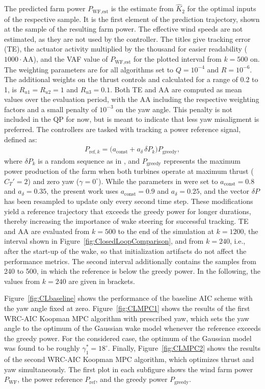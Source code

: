 The predicted farm power $P_{\text{WF,est}}$ is the estimate from $\hat{K}_2$ for the optimal inputs of the respective sample. It is the first element of the prediction trajectory, shown at the sample of the resulting farm power. The effective wind speeds are not estimated, as they are not used by the controller. The titles give tracking error (TE), the actuator activity multiplied by the thousand for easier readability ($1000\cdot$AA), and the VAF value of $P_{\text{WF,est}}$ for the plotted interval from $k = 500$ on. The weighting parameters are for all algorithms set to $Q = 10^{-4}$ and $R = 10^{-6}$. The additional weights on the thrust controls and calculated for a range of 0.2 to 1, is $R_{u1}=R_{u2}=1$ and $R_{u3}=0.1$. Both TE and AA are computed as mean values over the evaluation period, with the AA including the respective weighting factors and a small penalty of $10^{-3}$ on the yaw angle. This penalty is not included in the QP for now, but is meant to indicate that less yaw misaligment is preferred.
%
The controllers are tasked with tracking a power reference signal, defined as:
\begin{align*}
P_{\text{ref},k} = \big(a_{\text{const}} + a_{\delta} \, \delta P_k \big) P_{\text{greedy}},
\end{align*}
where $\delta P_k$ is a random sequence as in \cite{sharan2022Koopman}, and $P_{\text{greedy}}$ represents the maximum power production of the farm when both turbines operate at maximum thrust ($C_T' = 2$) and zero yaw ($\gamma = 0^\circ$). While the parameters in \cite{sharan2022Koopman} were set to $a_{\text{const}} = 0.8$ and $a_{\delta} = 0.35$, the present work uses $a_{\text{const}} = 0.9$ and $a_{\delta} = 0.25$, and the vector $\delta P$ has been resampled to update only every second time step. These modifications yield a reference trajectory that exceeds the greedy power for longer durations, thereby increasing the importance of wake steering for successful tracking. TE and AA are evaluated from $k = 500$ to the end of the simulation at $k = 1200$, the interval shown in Figure~\ref{fig:ClosedLoopComparison}, and from $k = 240$, i.e., after the start-up of the wake, so that initialization artifacts do not affect the performance metrics. The second interval additionally contains the samples from 240 to 500, in which the reference is below the greedy power. In the following, the values from $k = 240$ are given in brackets.

Figure~\ref{fig:CLbaseline} shows the performance of the baseline AIC scheme with the yaw angle fixed at zero. Figure~\ref{fig:CLMPC1} shows the results of the first WRC-AIC Koopman MPC algorithm with prescribed yaw, which sets the yaw angle to the optimum of the Gaussian wake model whenever the reference exceeds the greedy power. For the considered case, the optimum of the Gaussian model was found to be roughly $\gamma_1^* = 18^\circ$. Finally, Figure~\ref{fig:CLMPC2} shows the results of the second WRC-AIC Koopman MPC algorithm, which optimizes thrust and yaw simultaneously. The first plot in each subfigure shows the wind farm power $P_{\text{WF}}$, the power reference $P_{\text{ref}}$, and the greedy power $P_{\text{greedy}}$.

